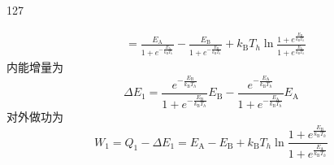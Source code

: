 \begin{solution}{127}
\begin{subsolution}
\begin{align}
            &= \frac {E _ {\mathrm{A}}}{1 + e ^ {- \frac {E _ {\mathrm{A}}}{k _ {\mathrm{B}} T _ {h}}}} - \frac {E _ {\mathrm{B}}}{1 + e ^ {- \frac {E _ {\mathrm{B}}}{k _ {\mathrm{B}} T _ {h}}}} + k _ {\mathrm{B}} T _ {h} \ln \frac {1 + e ^ {\frac {E _ {\mathrm{B}}}{k _ {\mathrm{B}} T _ {h}}}}{1 + e ^ {\frac {E _ {\mathrm{A}}}{k _ {\mathrm{B}} T _ {h}}}}
            \label{eq:18.s127}
        \end{align}
        内能增量为
        \begin{equation}
            \Delta E _ {1} = \frac {e ^ {- \frac {E _ {\mathrm{B}}}{k _ {\mathrm{B}} T _ {h}}}}{1 + e ^ {- \frac {E _ {\mathrm{B}}}{k _ {\mathrm{B}} T _ {h}}}} E _ {\mathrm{B}} - \frac {e ^ {- \frac {E _ {\mathrm{A}}}{k _ {\mathrm{B}} T _ {h}}}}{1 + e ^ {- \frac {E _ {\mathrm{A}}}{k _ {\mathrm{B}} T _ {h}}}} E _ {\mathrm{A}}
            \label{eq:19.s127}
        \end{equation}
        对外做功为
        \begin{equation}
            W _ {1} = Q _ {1} - \Delta E _ {1} = E _ {\mathrm{A}} - E _ {\mathrm{B}} + k _ {\mathrm{B}} T _ {h} \ln \frac {1 + e ^ {\frac {E _ {\mathrm{B}}}{k _ {\mathrm{B}} T _ {h}}}}{1 + e ^ {\frac {E _ {\mathrm{A}}}{k _ {\mathrm{B}} T _ {h}}}}
            \label{eq:20.s127}
        \end{equation}


\end{subsolution}
\end{solution}
